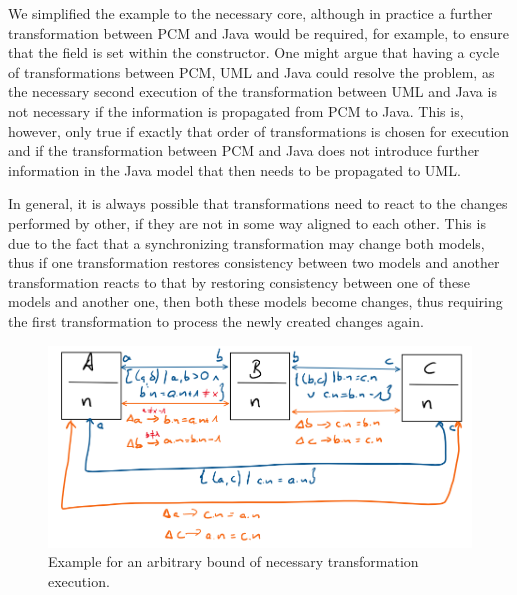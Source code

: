 We simplified the example to the necessary core, although in practice a further transformation between \gls{PCM} and Java would be required, for example, to ensure that the field is set within the constructor.
One might argue that having a cycle of transformations between \gls{PCM}, UML and Java could resolve the problem, as the necessary second execution of the transformation between UML and Java is not necessary if the information is propagated from \gls{PCM} to Java.
This is, however, only true if exactly that order of transformations is chosen for execution and if the transformation between \gls{PCM} and Java does not introduce further information in the Java model that then needs to be propagated to UML.

In general, it is always possible that transformations need to react to the changes performed by other, if they are not in some way aligned to each other.
This is due to the fact that a synchronizing transformation may change both models, thus if one transformation restores consistency between two models and another transformation reacts to that by restoring consistency between one of these models and another one, then both these models become changes, thus requiring the first transformation to process the newly created changes again.

\begin{figure}
    \centering
    \includegraphics[width=\textwidth]{figures/correctness/orchestration/no_upper_bound_example.png}
    \caption[Example for arbitrary bounds of transformation execution]{Example for an arbitrary bound of necessary transformation execution.}
    \label{fig:orchestration:no_upper_bound}
\end{figure}


